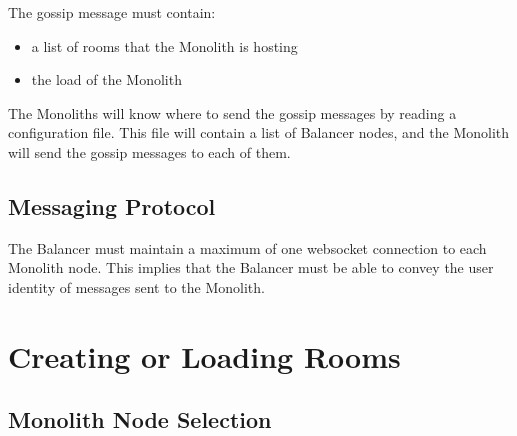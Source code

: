 The gossip message must contain:
\begin{itemize}
  \item a list of rooms that the Monolith is hosting
  \item the load of the Monolith
\end{itemize}

The Monoliths will know where to send the gossip messages by reading a configuration file. This file will contain a list of Balancer nodes, and the Monolith will send the gossip messages to each of them.

\subsection{Messaging Protocol}

The Balancer must maintain a maximum of one websocket connection to each Monolith node. This implies that the Balancer must be able to convey the user identity of messages sent to the Monolith.

\section{Creating or Loading Rooms}

\subsection{Monolith Node Selection}
